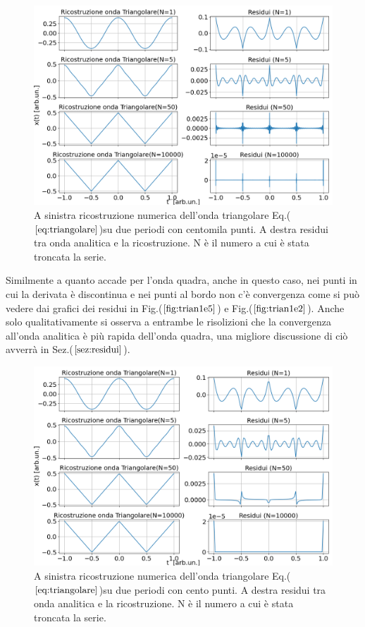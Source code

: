 \documentclass{article}
\begin{document}
        \begin{figure}[H]
            \centering
            \includegraphics[width=1.2\textwidth]{foutriawave1e5.png} %
            \caption{A sinistra ricostruzione numerica dell'onda triangolare
             Eq.($\ref{eq:triangolare}$)su due periodi con centomila punti.
            A destra residui tra onda analitica e la ricostruzione.
            N è il numero a cui è stata troncata la serie. }
            \label{fig:trian1e5}
        \end{figure}
        Similmente a quanto accade per l'onda quadra, anche in questo caso, nei punti 
        in cui la derivata è discontinua e nei punti al bordo non c'è convergenza come si 
        può vedere dai grafici dei residui in Fig.($\ref{fig:trian1e5}$) e Fig.($\ref{fig:trian1e2}$).
        Anche solo qualitativamente si osserva a entrambe le risolizioni che la convergenza all'onda
        analitica è più rapida dell'onda quadra, una migliore discussione di ciò avverrà in
        Sez.($\ref{sez:residui}$).
        \begin{figure}[H]
            \centering
            \includegraphics[width=1.2\textwidth]{foutriawave1e2.png} %
            \caption{A sinistra ricostruzione numerica dell'onda triangolare
            Eq.($\ref{eq:triangolare}$)su due periodi con cento punti.
           A destra residui tra onda analitica e la ricostruzione.
           N è il numero a cui è stata troncata la serie. }
            \label{fig:trian1e2}
        \end{figure}        
        
\end{document}
